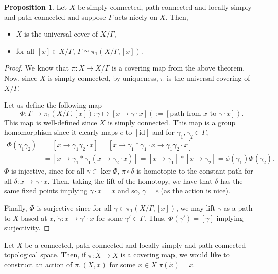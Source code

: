 \documentclass[]{article}
\theoremstyle{definition}
\theoremstyle{definition}
\newtheorem{proposition}{Proposition}[section]
\begin{document}
\begin{proposition}
  Let \(X\) be simply connected, path connected and locally simply and path connected 
  and suppose \(\Gamma\) acts nicely on \(X\). Then, 
  \begin{itemize}
    \item \(X\) is the universal cover of \(X / \Gamma\),
    \item for all \([x] \in X / \Gamma\), \(\Gamma \simeq \pi_1(X / \Gamma, [x])\).
  \end{itemize}
\end{proposition}
\begin{proof}
  We know that \(\pi : X \to X / \Gamma\) is a covering map from the above theorem. 
  Now, since \(X\) is simply connected, by uniqueness, \(\pi\) is the universal 
  covering of \(X / \Gamma\).

  Let us define the following map 
  \[\Phi : \Gamma \to \pi_1(X / \Gamma, [x]) : \gamma \mapsto [x \to \gamma \cdot x] (:= [\text{path from } x \text{ to } \gamma \cdot x]).\]
  This map is well-defined since \(X\) is simply connected. This map is a group 
  homomorphism since it clearly maps \(e\) to \([\text{id}]\) and for \(\gamma_1, \gamma_2 \in \Gamma\), 
  \[\begin{split}
    \Phi(\gamma_1 \gamma_2) & = [x \to \gamma_1 \gamma_2 \cdot x] = [x \to \gamma_1 * \gamma_1 \cdot x \to \gamma_1 \gamma_2 \cdot x]\\
  & = [x \to \gamma_1 * \gamma_1(x \to \gamma_2 \cdot x)] = [x \to \gamma_1] * [x \to \gamma_2] = \phi(\gamma_1) \Phi(\gamma_2).
  \end{split}\]
  \(\Phi\) is injective, since for all \(\gamma \in \ker \Phi\), \(\pi \circ \delta\) 
  is homotopic to the constant path for all \(\delta : x \to \gamma \cdot x\). 
  Then, taking the lift of the homotopy, we have that \(\delta\) has the same fixed 
  points implying \(\gamma \cdot x = x\) and so, \(\gamma = e\) (as the action is nice). 

  Finally, \(\Phi\) is surjective since for all \(\gamma \in \pi_1(X / \Gamma, [x])\), we 
  may lift \(\gamma\) as a path to \(X\) based at \(x\), \(\tilde \gamma : x \to \gamma' \cdot x\) 
  for some \(\gamma' \in \Gamma\). Thus, \(\Phi(\gamma') = [\gamma]\) implying 
  surjectivity.
\end{proof}

Let \(X\) be a connected, path-connected and locally simply and path-connected 
topological space. Then, if \(\pi : \tilde X \to X\) is a covering map, we would like 
to construct an action of \(\pi_1(X, x)\) for some \(x \in X\) \(\pi(\tilde x) = x\).
\end{document}

